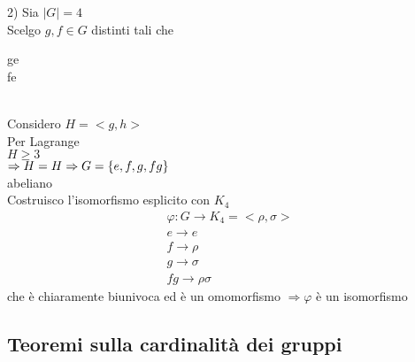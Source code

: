 \documentclass[12px]{article}
\begin{document}
{		2) Sia $|G| = 4$\\
		Scelgo  $g,f\in G$ distinti tali che \begin{cases}
			g\neq e\\
			f\neq e
		\end{cases}\\
		Considero $H = <g,h>$ \\
		Per Lagrange\\
		$H \geq 3$\\
		$ \Rightarrow H = H\\
		\Rightarrow G = \{e,f,g,fg\}$\\
		abeliano\\
		Costruisco l'isomorfismo esplicito con $K_4$\\
		\begin{gather*}
			\varphi:G \rightarrow K_4 = <\rho,\sigma>\\
			e \rightarrow e\\
			f \rightarrow\rho\\
			g \rightarrow\sigma\\
			fg \rightarrow\rho\sigma
		\end{gather*}
		che è chiaramente biunivoca ed è un omomorfismo $ \Rightarrow \varphi$ è un isomorfismo
		
		\newpage
\subsection{Teoremi sulla cardinalità dei gruppi}
	\begin{teo}
		

\end{teo}}
\end{document}

